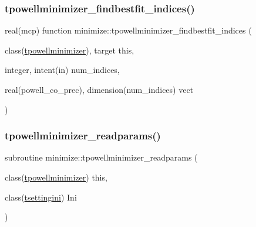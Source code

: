 \mbox{\label{namespaceminimize_a0ac8b152c3df29a4c741afc485238419}} 
\subsubsection{\texorpdfstring{tpowellminimizer\+\_\+findbestfit\+\_\+indices()}{tpowellminimizer\_findbestfit\_indices()}}
{\footnotesize\ttfamily real(mcp) function minimize\+::tpowellminimizer\+\_\+findbestfit\+\_\+indices (\begin{DoxyParamCaption}\item[{class(\mbox{\hyperlink{structminimize_1_1tpowellminimizer}{tpowellminimizer}}), target}]{this,  }\item[{integer, intent(in)}]{num\+\_\+indices,  }\item[{real(powell\+\_\+co\+\_\+prec), dimension(num\+\_\+indices)}]{vect }\end{DoxyParamCaption})\hspace{0.3cm}{\ttfamily [private]}}

\mbox{\label{namespaceminimize_a2781b5142c2289caf0a2221442578c02}} 
\subsubsection{\texorpdfstring{tpowellminimizer\+\_\+readparams()}{tpowellminimizer\_readparams()}}
{\footnotesize\ttfamily subroutine minimize\+::tpowellminimizer\+\_\+readparams (\begin{DoxyParamCaption}\item[{class(\mbox{\hyperlink{structminimize_1_1tpowellminimizer}{tpowellminimizer}})}]{this,  }\item[{class(\mbox{\hyperlink{structsettings_1_1tsettingini}{tsettingini}})}]{Ini }\end{DoxyParamCaption})\hspace{0.3cm}{\ttfamily [private]}}

\mbox{\label{namespaceminimize_ae5c43479fd4ab1a7fef6e43a93442e37}} 
